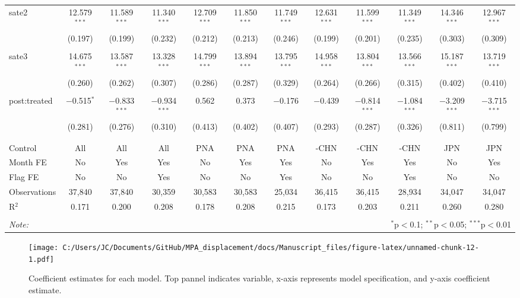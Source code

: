 \documentclass[11pt,]{article}
\begin{document}
\begin{landscape}
\begin{table}[!htbp]
\begin{tabular}{@{\extracolsep{1pt}}lccccccccccc}
 sate2 & 12.579$^{***}$ & 11.589$^{***}$ & 11.340$^{***}$ & 12.709$^{***}$ & 11.850$^{***}$ & 11.749$^{***}$ & 12.631$^{***}$ & 11.599$^{***}$ & 11.349$^{***}$ & 14.346$^{***}$ & 12.967$^{***}$ \\ 
  & (0.197) & (0.199) & (0.232) & (0.212) & (0.213) & (0.246) & (0.199) & (0.201) & (0.235) & (0.303) & (0.309) \\ 
  & & & & & & & & & & & \\ 
 sate3 & 14.675$^{***}$ & 13.587$^{***}$ & 13.328$^{***}$ & 14.799$^{***}$ & 13.894$^{***}$ & 13.795$^{***}$ & 14.958$^{***}$ & 13.804$^{***}$ & 13.566$^{***}$ & 15.187$^{***}$ & 13.719$^{***}$ \\ 
  & (0.260) & (0.262) & (0.307) & (0.286) & (0.287) & (0.329) & (0.264) & (0.266) & (0.315) & (0.402) & (0.410) \\ 
  & & & & & & & & & & & \\ 
 post:treated & $-$0.515$^{*}$ & $-$0.833$^{***}$ & $-$0.934$^{***}$ & 0.562 & 0.373 & $-$0.176 & $-$0.439 & $-$0.814$^{***}$ & $-$1.084$^{***}$ & $-$3.209$^{***}$ & $-$3.715$^{***}$ \\ 
  & (0.281) & (0.276) & (0.310) & (0.413) & (0.402) & (0.407) & (0.293) & (0.287) & (0.326) & (0.811) & (0.799) \\ 
  & & & & & & & & & & & \\ 
\hline \\[-1.8ex] 
Control & All & All & All & PNA & PNA & PNA & -CHN & -CHN & -CHN & JPN & JPN \\ 
Month FE & No & Yes & Yes & No & Yes & Yes & No & Yes & Yes & No & Yes \\ 
Flag FE & No & No & Yes & No & No & Yes & No & No & Yes & No & No \\ 
Observations & 37,840 & 37,840 & 30,359 & 30,583 & 30,583 & 25,034 & 36,415 & 36,415 & 28,934 & 34,047 & 34,047 \\ 
R$^{2}$ & 0.171 & 0.200 & 0.208 & 0.178 & 0.208 & 0.215 & 0.173 & 0.203 & 0.211 & 0.260 & 0.280 \\ 
\hline 
\hline \\[-1.8ex] 
\textit{Note:}  & \multicolumn{11}{r}{$^{*}$p$<$0.1; $^{**}$p$<$0.05; $^{***}$p$<$0.01} \\ 
\end{tabular} 
\end{table} 

\end{landscape}
\clearpage

\begin{figure}
\centering
\texttt{[image: C:/Users/JC/Documents/GitHub/MPA\_displacement/docs/Manuscript\_files/figure-latex/unnamed-chunk-12-1.pdf]}
\caption{\label{fig:unnamed-chunk-12}\label{fig:long}Coefficient estimates
for each model. Top pannel indicates variable, x-axis represents model
specification, and y-axis coefficient estimate.}
\end{figure}
\end{document}
